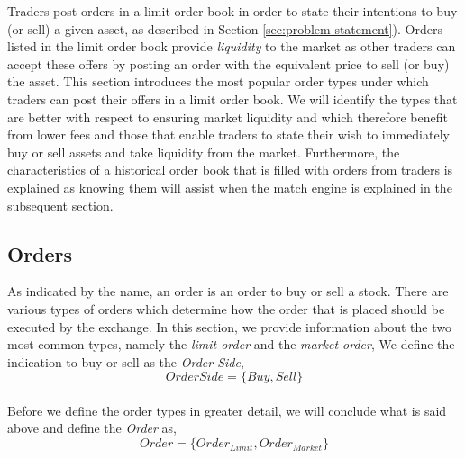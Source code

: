 Traders post orders in a limit order book in order to state their intentions to buy (or sell) a given asset, as described in Section \ref{sec:problem-statement}).
Orders listed in the limit order book provide \textit{liquidity} to the market as other traders can accept these offers by posting an order with the equivalent price to sell (or buy) the asset.
This section introduces the most popular order types under which traders can post their offers in a limit order book.
We will identify the types that are better with respect to ensuring market liquidity and which therefore benefit from lower fees and those that enable traders to state their wish to immediately buy or sell assets and take liquidity from the market.
Furthermore, the characteristics of a historical order book that is filled with orders from traders is explained as knowing them will assist when the match engine is explained in the subsequent section.

\subsection{Orders}
\label{sec:orders}

As indicated by the name, an order is an order to buy or sell a stock.
There are various types of orders which determine how the order that is placed should be executed by the exchange.
In this section, we provide information about the two most common types, namely the \textit{limit order} and the \textit{market order},
We define the indication to buy or sell as the \textit{Order Side},
\begin{equation}\label{eq:order-side}
    OrderSide=\{Buy, Sell\}
\end{equation}
\\
Before we define the order types in greater detail, we will conclude what is said above and define the \textit{Order} as,
\begin{equation}\label{eq:order}
Order=\{Order_{Limit}, Order_{Market}\}
\end{equation}

